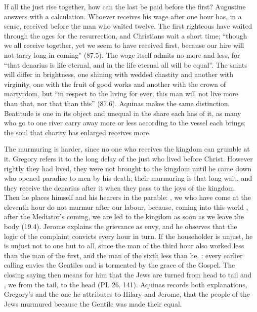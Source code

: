 If all the just rise together, how can the last be paid before the first?
Augustine answers with a calculation. Whoever receives his wage after one hour
has, in a sense, received before the man who waited twelve. The first
righteous have waited through the ages for the resurrection, and Christians
wait a short time; ``though we all receive together, yet we seem to have
received first, because our hire will not tarry long in coming'' (87.5). The
wage itself admits no more and less, for ``that denarius is life eternal, and
in the life eternal all will be equal''. The saints will differ in brightness,
one shining with wedded chastity and another with virginity, one with the
fruit of good works and another with the crown of martyrdom, but ``in respect
to the living for ever, this man will not live more than that, nor that than
this'' (87.6). Aquinas makes the same distinction. Beatitude is one in its object and unequal in the share each has of
it, as many who go to one river carry away more or less according to the
vessel each brings; the soul that charity has enlarged receives more.

The murmuring is harder, since no one who receives the kingdom can grumble at
it. Gregory refers it to the long delay of the just who lived before Christ.
However rightly they had lived, they were not brought to the kingdom until he
came down who opened paradise to men by his death; their murmuring is that
long wait, and they receive the denarius after it when they pass to the joys
of the kingdom. Then he places himself and his hearers in the parable:
, we who have come at the eleventh
hour do not murmur after our labour, because, coming into this world
, after the Mediator's coming, we are led to
the kingdom as soon as we leave the body (19.4). Jerome explains the grievance
as envy, and he observes that the logic of the complaint convicts every hour in
turn. If the householder is unjust, he is unjust not to one but to all, since
the man of the third hour also worked less than the man of the first, and the
man of the sixth less than he. : every earlier calling envies the
Gentiles and is tormented by the grace of the Gospel. The closing saying then
means for him that the Jews are turned from head to tail and , we from the tail, to the head (PL 26, 141). Aquinas records both
explanations, Gregory's and the one he attributes to Hilary and Jerome, that
the people of the Jews murmured because the Gentile was made their equal.

